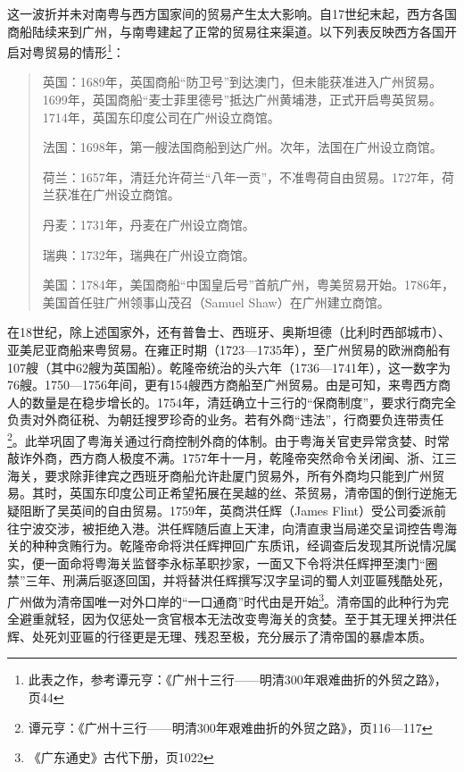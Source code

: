 这一波折并未对南粤与西方国家间的贸易产生太大影响。自17世纪末起，西方各国商船陆续来到广州，与南粤建起了正常的贸易往来渠道。以下列表反映西方各国开启对粤贸易的情形\footnote{此表之作，参考谭元亨：《广州十三行——明清300年艰难曲折的外贸之路》，页44}：

\begin{quote}
	英国：1689年，英国商船“防卫号”到达澳门，但未能获准进入广州贸易。1699年，英国商船“麦士菲里德号”抵达广州黄埔港，正式开启粤英贸易。1714年，英国东印度公司在广州设立商馆。
	
	法国：1698年，第一艘法国商船到达广州。次年，法国在广州设立商馆。
	
	荷兰：1657年，清廷允许荷兰“八年一贡”，不准粤荷自由贸易。1727年，荷兰获准在广州设立商馆。
	
	丹麦：1731年，丹麦在广州设立商馆。
	
	瑞典：1732年，瑞典在广州设立商馆。
	
	美国：1784年，美国商船“中国皇后号”首航广州，粤美贸易开始。1786年，美国首任驻广州领事山茂召（Samuel Shaw）在广州建立商馆。
\end{quote}

在18世纪，除上述国家外，还有普鲁士、西班牙、奥斯坦德（比利时西部城市）、亚美尼亚商船来粤贸易。在雍正时期（1723—1735年），至广州贸易的欧洲商船有107艘（其中62艘为英国船）。乾隆帝统治的头六年（1736—1741年），这一数字为76艘。1750—1756年间，更有154艘西方商船至广州贸易。由是可知，来粤西方商人的数量是在稳步增长的。1754年，清廷确立十三行的“保商制度”，要求行商完全负责对外商征税、为朝廷搜罗珍奇的业务。若有外商“违法”，行商要负连带责任\footnote{谭元亨：《广州十三行——明清300年艰难曲折的外贸之路》，页116—117}。此举巩固了粤海关通过行商控制外商的体制。由于粤海关官吏异常贪婪、时常敲诈外商，西方商人极度不满。1757年十一月，乾隆帝突然命令关闭闽、浙、江三海关，要求除菲律宾之西班牙商船允许赴厦门贸易外，所有外商均只能到广州贸易。其时，英国东印度公司正希望拓展在吴越的丝、茶贸易，清帝国的倒行逆施无疑阻断了吴英间的自由贸易。1759年，英商洪任辉（James Flint）受公司委派前往宁波交涉，被拒绝入港。洪任辉随后直上天津，向清直隶当局递交呈词控告粤海关的种种贪贿行为。乾隆帝命将洪任辉押回广东质讯，经调查后发现其所说情况属实，便一面命将粤海关监督李永标革职抄家，一面又下令将洪任辉押至澳门“圈禁”三年、刑满后驱逐回国，并将替洪任辉撰写汉字呈词的蜀人刘亚匾残酷处死，广州做为清帝国唯一对外口岸的“一口通商”时代由是开始\footnote{《广东通史》古代下册，页1022}。清帝国的此种行为完全避重就轻，因为仅惩处一贪官根本无法改变粤海关的贪婪。至于其无理关押洪任辉、处死刘亚匾的行径更是无理、残忍至极，充分展示了清帝国的暴虐本质。

